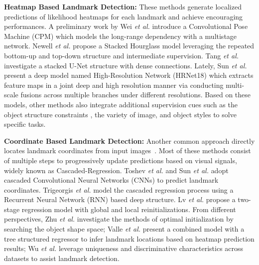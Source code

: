 \documentclass[runningheads]{llncs}
\begin{document}
\textbf{Heatmap Based Landmark Detection:}  These methods \cite{wei2016convolutional,newell2016stacked,tang2018quantized,sun2019deep,payer2016regressing,chen2019cephalometric} generate localized predictions of likelihood heatmaps for each landmark and achieve encouraging performances. A preliminary work by Wei \textit{et al.} \cite{wei2016convolutional} introduce a Convolutional Pose Machine (CPM) which models the long-range dependency with a multistage network. Newell \textit{et al.} \cite{newell2016stacked} propose a Stacked Hourglass model leveraging the repeated bottom-up and top-down structure and intermediate supervision. Tang \textit{et al.} \cite{tang2018quantized} investigate a stacked U-Net structure with dense connections. Lately, Sun \textit{et al.} \cite{sun2019deep} present a deep model named High-Resolution Network (HRNet18) which extracts feature maps in a joint deep and high resolution manner via conducting multi-scale fusions across multiple branches under different resolutions. Based on these models, other methods also integrate additional supervision cues such as the object structure constraints \cite{wu2019facial,zoulearning}, the variety of image, and object styles \cite{dong2018style,qian2019aggregation} to solve specific tasks.

\textbf{Coordinate Based Landmark Detection:} Another common approach directly locates landmark coordinates from input images~\cite{toshev2014deeppose,sun2013deep,trigeorgis2016mnemonic,lv2017deep,zhu2015face,liu2016fashion,su2019efficient}. Most of these methods consist of multiple steps to progressively update predictions based on visual signals, widely known as Cascaded-Regression. Toshev \textit{et al.} \cite{toshev2014deeppose} and Sun \textit{et al.} \cite{sun2013deep} adopt cascaded Convolutional Neural Networks (CNNs) to predict landmark coordinates. Trigeorgis \textit{et al.} \cite{trigeorgis2016mnemonic} model the cascaded regression process using a Recurrent Neural Network (RNN) based deep structure. Lv \textit{et al.} \cite{lv2017deep} propose a two-stage regression model with global and local reinitializations. From different perspectives, Zhu \textit{et al.} \cite{zhu2015face} investigate the methods of optimal initialization by searching the object shape space; Valle \textit{et al.} \cite{valle2018deeply} present a combined model with a tree structured regressor to infer landmark locations based on heatmap prediction results; Wu \textit{et al.} \cite{wu2017leveraging} leverage uniqueness and discriminative characteristics across datasets to assist landmark detection.
\end{document}
